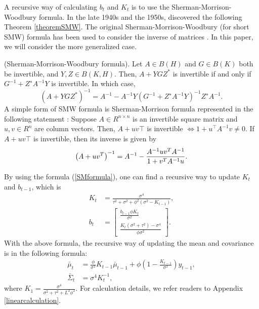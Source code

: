 A recursive way of calculating $b_t$ and $K_t$ is to use the Sherman-Morrison-Woodbury formula. In the late 1940s and the 1950s,
\cite{sherman1950adjustment, woodbury1950inverting, bartlett1951inverse, bodewig1956matrix} 
discovered the following Theorem \ref{theoremSMW}. The original Sherman-Morrison-Woodbury (for short SMW) formula has been used to consider the inverse of matrices \citep{deng2011generalization}. In this paper, we will consider the more generalized case. 
\begin{theorem}\label{theoremSMW}
(Sherman-Morrison-Woodbury formula). Let $A \in B(H)$ and $G \in B(K)$ both be invertible, and $Y, Z \in B(K, H)$. Then, $A + YGZ^*$ is invertible if and only if $G^{-1} + Z^∗A^{-1}Y$ is invertible. In which case,
\begin{equation}\label{SMWformula}
\left(A+YGZ^*\right)^{-1}= A^{-1}-A^{-1}Y\left(G^{-1}+Z^∗A^{-1}Y\right)^{-1}Z^∗A^{-1}.
\end{equation}
A simple form of SMW formula is Sherman-Morrison formula represented in the following statement \citep{bartlett1951inverse}:
Suppose $A\in R^{n\times n}$ is an invertible square matrix and $u,v\in R^n$ are column vectors. Then, $A+uv\top$ is invertible $\iff 1+u^\top A^{-1}v\neq 0$. If $A+uv\top$ is invertible, then its inverse is given by
\begin{equation}\label{SMformula}
\left(A+uv^{T}\right)^{-1}=A^{-1}-{A^{-1}uv^{T}A^{-1} \over 1+v^{T}A^{-1}u}.
\end{equation}
\end{theorem}


By using the formula (\ref{SMformula}), one can find a recursive way to update $K_{t}$ and $b_{t-1}$, which is 
\begin{align}
K_{t}  &=\frac{\sigma^4}{\tau^2+\sigma^2+\phi^2(\sigma^2-K_{t-1})},\\
b_{t} &= \begin{bmatrix}
\frac{b_{t-1}\phi K_{t}}{\sigma^2} \\ \frac{K_{t}(\sigma^2+\tau^2)-\sigma^4 }{\phi\sigma^2}
\end{bmatrix}. 
\end{align}
With the above formula, the recursive way of updating the mean and covariance is in the following formula: 
\begin{align}
\bar{\mu}_{t}       & = \frac{\phi}{\sigma^2}K_{t-1}\bar{\mu}_{t-1} + \phi \left(1 - \frac{K_{t-1}}{\sigma^2}\right)y_{t-1}, \\
\bar{\Sigma}_{t}  &= \sigma^4K_{t}^{-1},
\end{align}
where $K_1=\frac{\sigma^4}{\sigma^2+\tau^2+L^2\phi^2}$. For calculation details, we refer readers to Appendix \ref{linearcalculation}.


